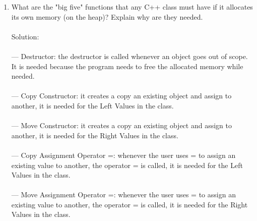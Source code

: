 \documentclass[12pt]{article}
\begin{document}
\begin{enumerate}
\item  What are the "big five" functions that any C++ class must have if it
  allocates its own memory (on the heap)? Explain why are they needed.
  \\\\Solution:
  \\\\--- Destructor: the destructor is called whenever an object goes out of scope. It is needed because the program needs to free the allocated memory while needed.
  \\\\--- Copy Constructor: it creates a copy an existing object and assign to another, it is needed for the Left Values in the class.
  \\\\--- Move Constructor: it creates a copy an existing object and assign to another, it is needed for the Right Values in the class.
  \\\\--- Copy Assignment Operator =: whenever the user uses = to assign an existing value to another, the operator = is called, it is needed for the Left Values in the class.
  \\\\--- Move Assignment Operator =: whenever the user uses = to assign an existing value to another, the operator = is called, it is needed for the Right Values in the class.
  \\\\


\end{enumerate}
\end{document}
